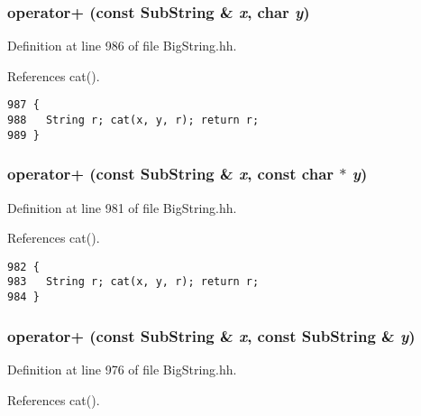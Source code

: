 \subsubsection{ operator+ (const {\bf Sub\-String} \& {\em x}, char {\em y})\hspace{0.3cm}{\tt  [inline]}}\label{BigString_8hh_a77}




Definition at line 986 of file Big\-String.hh.

References cat().



\footnotesize\begin{verbatim}987 {
988   String r; cat(x, y, r); return r;
989 }
\end{verbatim}\normalsize 
{}
\subsubsection{ operator+ (const {\bf Sub\-String} \& {\em x}, const char $\ast$ {\em y})\hspace{0.3cm}{\tt  [inline]}}\label{BigString_8hh_a76}




Definition at line 981 of file Big\-String.hh.

References cat().



\footnotesize\begin{verbatim}982 {
983   String r; cat(x, y, r); return r;
984 }
\end{verbatim}\normalsize 
{}
\subsubsection{ operator+ (const {\bf Sub\-String} \& {\em x}, const {\bf Sub\-String} \& {\em y})\hspace{0.3cm}{\tt  [inline]}}\label{BigString_8hh_a75}




Definition at line 976 of file Big\-String.hh.

References cat().



